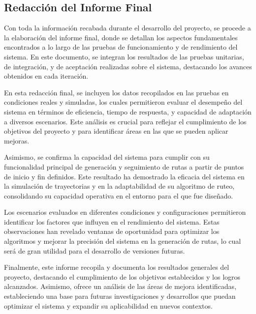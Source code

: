 \subsection{Redacci\'on del Informe Final} %

    Con toda la informaci\'on recabada durante el desarrollo del proyecto, 
        se procede a la elaboraci\'on del informe final, donde se detallan 
        los aspectos fundamentales encontrados a lo largo de las pruebas 
        de funcionamiento y de rendimiento del sistema. En este documento, 
        se integran los resultados de las pruebas unitarias, de integraci\'on, 
        y de aceptaci\'on realizadas sobre el sistema, destacando los avances 
        obtenidos en cada iteraci\'on.

    \vskip 0.5cm

    En esta redacci\'on final, se incluyen los datos recopilados en las pruebas en condiciones 
        reales y simuladas, los cuales permitieron evaluar el desempe\~no del sistema en t\'erminos 
        de eficiencia, tiempo de respuesta, y capacidad de adaptaci\'on a diversos escenarios. 
        Este an\'alisis es crucial para reflejar el cumplimiento de los objetivos del proyecto y 
        para identificar \'areas en las que se pueden aplicar mejoras.

    \vskip 0.5cm

    Asimismo, se confirma la capacidad del sistema para cumplir con su funcionalidad principal 
        de generaci\'on y seguimiento de rutas a partir de puntos de inicio y fin definidos. 
        Este resultado ha demostrado la eficacia del sistema en la simulaci\'on de trayectorias 
        y en la adaptabilidad de su algoritmo de ruteo, consolidando su capacidad operativa en 
        el entorno para el que fue dise\~nado.

    \vskip 0.5cm

    Los escenarios evaluados en diferentes condiciones y configuraciones permitieron identificar 
        los factores que influyen en el rendimiento del sistema. Estas observaciones han revelado 
        ventanas de oportunidad para optimizar los algoritmos y mejorar la precisi\'on del sistema 
        en la generaci\'on de rutas, lo cual ser\'a de gran utilidad para el desarrollo de versiones futuras.

    \vskip 0.5cm

    Finalmente, este informe recopila y documenta los resultados generales del proyecto, 
        destacando el cumplimiento de los objetivos establecidos y los logros alcanzados. 
        Asimismo, ofrece un an\'alisis de las \'areas de mejora identificadas, estableciendo 
        una base para futuras investigaciones y desarrollos que puedan optimizar el sistema y 
        expandir su aplicabilidad en nuevos contextos.
    \vskip 0.5cm
